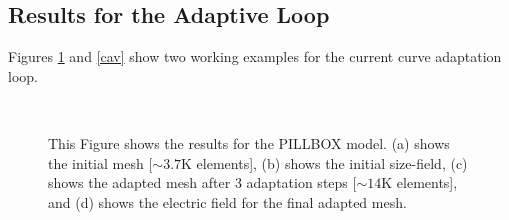 \documentclass[review,12pt]{elsarticle_summary_report}
\begin{document}
\subsection{Results for the Adaptive Loop}
Figures \ref{pill} and \ref{cav} show two working examples for the current curve adaptation loop.
\begin{landscape}
\begin{figure}[ph!]
\centering
{}
\hspace*{50pt}
\\
\hspace*{50pt}
\caption{\label{pill} This Figure shows the results for the PILLBOX model. (a) shows the initial mesh [$\sim3.7\text{K}$ elements], (b) shows the initial size-field, (c) shows the adapted mesh after 3 adaptation steps [$\sim14\text{K}$ elements], and (d) shows the electric field for the final adapted mesh.}
\end{figure}
\end{landscape}
\end{document}
